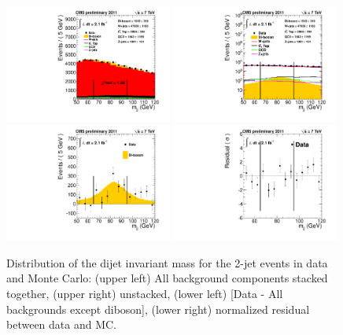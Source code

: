\begin{figure}[h!t]
  {\centering
    \includegraphics[width=0.49\textwidth]{plots/kalanand_2jetsample/mJJ_Stacked.pdf}
    \includegraphics[width=0.49\textwidth]{plots/kalanand_2jetsample/mJJ-combined-fit-logY-truncated.pdf}
    \includegraphics[width=0.49\textwidth]{plots/kalanand_2jetsample/mJJ-combined-fit-subtracted-truncated.pdf}
    \includegraphics[width=0.49\textwidth]{plots/kalanand_2jetsample/mJJ-combined-fit-residual-truncated.pdf}

    \caption{Distribution of the dijet invariant mass for the 2-jet events in data and Monte Carlo: 
      (upper left) All background components stacked together, 
      (upper right) unstacked, (lower left) [Data -  All backgrounds except diboson],  
      (lower right) normalized residual between data and MC.}
    \label{fig:mjj_2jet}}
\end{figure}
